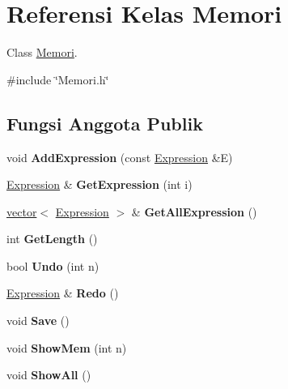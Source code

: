 \hypertarget{classMemori}{}\section{Referensi Kelas Memori}
\label{classMemori}


Class \hyperlink{classMemori}{Memori}.  




{\ttfamily \#include \char`\"{}Memori.\+h\char`\"{}}

\subsection*{Fungsi Anggota Publik}
\begin{DoxyCompactItemize}
\item 
\hypertarget{classMemori_a23ded2c06e083765b179044017d4568a}{}void {\bfseries Add\+Expression} (const \hyperlink{classExpression}{Expression} \&E)\label{classMemori_a23ded2c06e083765b179044017d4568a}

\item 
\hypertarget{classMemori_a7a31731f8c96c7d1b88341c8e30f736c}{}\hyperlink{classExpression}{Expression} \& {\bfseries Get\+Expression} (int i)\label{classMemori_a7a31731f8c96c7d1b88341c8e30f736c}

\item 
\hypertarget{classMemori_a1d24e2a91215739281ce457f30daa1de}{}\hyperlink{classvector}{vector}$<$ \hyperlink{classExpression}{Expression} $>$ \& {\bfseries Get\+All\+Expression} ()\label{classMemori_a1d24e2a91215739281ce457f30daa1de}

\item 
\hypertarget{classMemori_a1d60446414aff4f88bc9a478c56fe4c9}{}int {\bfseries Get\+Length} ()\label{classMemori_a1d60446414aff4f88bc9a478c56fe4c9}

\item 
\hypertarget{classMemori_ad992ea2a1b19e5fd131f93bac469bd68}{}bool {\bfseries Undo} (int n)\label{classMemori_ad992ea2a1b19e5fd131f93bac469bd68}

\item 
\hypertarget{classMemori_a023b90b740fb802f5c480ab9057f23b2}{}\hyperlink{classExpression}{Expression} \& {\bfseries Redo} ()\label{classMemori_a023b90b740fb802f5c480ab9057f23b2}

\item 
\hypertarget{classMemori_a50d47e3155b87094ea21706cfc5f3b09}{}void {\bfseries Save} ()\label{classMemori_a50d47e3155b87094ea21706cfc5f3b09}

\item 
\hypertarget{classMemori_a54eee01b6f3e33fbecd84bb8e9f44504}{}void {\bfseries Show\+Mem} (int n)\label{classMemori_a54eee01b6f3e33fbecd84bb8e9f44504}

\item 
\hypertarget{classMemori_a6b3d1bc5a0fd7c61546741ec96ff50ad}{}void {\bfseries Show\+All} ()\label{classMemori_a6b3d1bc5a0fd7c61546741ec96ff50ad}

\end{DoxyCompactItemize}


